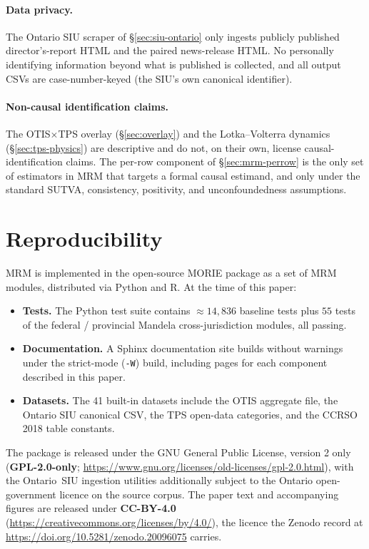 \documentclass[11pt,a4paper]{article}
\theoremstyle{plain}
\theoremstyle{definition}
\theoremstyle{remark}
\begin{document}
\paragraph{Data privacy.} The Ontario SIU scraper of
\S\ref{sec:siu-ontario} only ingests publicly published
director's-report HTML and the paired news-release HTML. No
personally identifying information beyond what is published is
collected, and all output CSVs are case-number-keyed (the SIU's
own canonical identifier).

\paragraph{Non-causal identification claims.} The OTIS$\times$TPS
overlay (\S\ref{sec:overlay}) and the Lotka--Volterra dynamics
(\S\ref{sec:tps-physics}) are descriptive and do not, on their
own, license causal-identification claims. The per-row component
of \S\ref{sec:mrm-perrow} is the only set of estimators in MRM
that targets a formal causal estimand, and only under the
standard SUTVA, consistency, positivity, and unconfoundedness
assumptions.

\section{Reproducibility}
\label{sec:reproducibility}

MRM is implemented in the open-source MORIE package as a
set of MRM modules, distributed via Python and R. At the
time of this paper:
\begin{itemize}
  \item \textbf{Tests.} The Python test suite contains $\approx
        14{,}836$ baseline tests plus $55$ tests of the federal
        / provincial Mandela cross-jurisdiction modules, all
        passing.
  \item \textbf{Documentation.} A Sphinx documentation site
        builds without warnings under the strict-mode
        (\verb|-W|) build, including pages for each component
        described in this paper.
  \item \textbf{Datasets.} The 41 built-in datasets include the
        OTIS aggregate file, the Ontario SIU canonical CSV, the
        TPS open-data categories, and the CCRSO 2018 table
        constants.
\end{itemize}

The package is released under the GNU General Public License,
version 2 only (\textbf{GPL-2.0-only};
\url{https://www.gnu.org/licenses/old-licenses/gpl-2.0.html}), with
the Ontario~SIU ingestion utilities additionally subject to the
Ontario open-government licence on the source corpus. The paper
text and accompanying figures are released under \textbf{CC-BY-4.0}
(\url{https://creativecommons.org/licenses/by/4.0/}), the licence
the Zenodo record at \url{https://doi.org/10.5281/zenodo.20096075}
carries.
\end{document}
